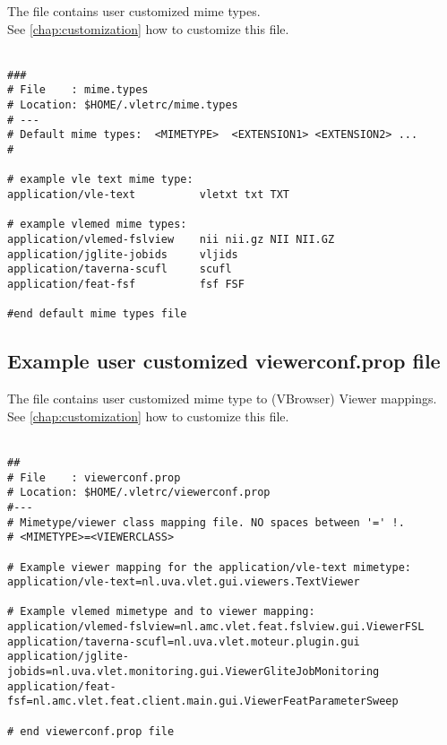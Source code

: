 The file  contains 
user customized mime types. \\
See \ref{chap:customization}  how to customize this file.\\ 
\\
  \begin{boxedlisting}[170]
\begin{verbatim}
###
# File    : mime.types
# Location: $HOME/.vletrc/mime.types
# ---
# Default mime types:  <MIMETYPE>  <EXTENSION1> <EXTENSION2> ...
#

# example vle text mime type: 
application/vle-text          vletxt txt TXT

# example vlemed mime types:  
application/vlemed-fslview    nii nii.gz NII NII.GZ
application/jglite-jobids     vljids
application/taverna-scufl     scufl
application/feat-fsf          fsf FSF 

#end default mime types file 
\end{verbatim}
\end{boxedlisting}
 
\subsection{Example user customized viewerconf.prop file}

The file  contains 
user customized mime type to (VBrowser) Viewer mappings.\\ 
See \ref{chap:customization}  how to customize this file. \\
\\
\begin{boxedlisting}
\begin{verbatim}
##
# File    : viewerconf.prop 
# Location: $HOME/.vletrc/viewerconf.prop
#---
# Mimetype/viewer class mapping file. NO spaces between '=' !.  
# <MIMETYPE>=<VIEWERCLASS> 

# Example viewer mapping for the application/vle-text mimetype:
application/vle-text=nl.uva.vlet.gui.viewers.TextViewer

# Example vlemed mimetype and to viewer mapping: 
application/vlemed-fslview=nl.amc.vlet.feat.fslview.gui.ViewerFSL
application/taverna-scufl=nl.uva.vlet.moteur.plugin.gui
application/jglite-jobids=nl.uva.vlet.monitoring.gui.ViewerGliteJobMonitoring
application/feat-fsf=nl.amc.vlet.feat.client.main.gui.ViewerFeatParameterSweep

# end viewerconf.prop file 
\end{verbatim}
\end{boxedlisting}\\
\\

 
 
